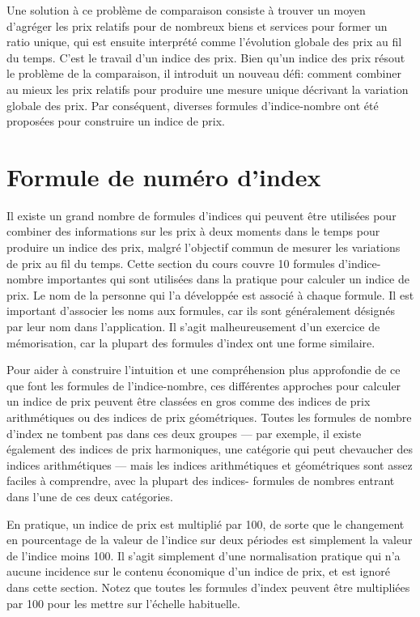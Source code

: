 \documentclass[]{article}
\begin{document}
Une solution à ce problème de comparaison consiste à trouver un moyen d'agréger les prix relatifs pour de nombreux biens et services pour former un ratio unique, qui est ensuite interprété comme l'évolution globale des prix au fil du temps. C'est le travail d'un indice des prix. Bien qu'un indice des prix résout le problème de la comparaison, il introduit un nouveau défi: comment combiner au mieux les prix relatifs pour produire une mesure unique décrivant la variation globale des prix. Par conséquent, diverses formules d'indice-nombre ont été proposées pour construire un indice de prix.

\hypertarget{formule-de-numuxe9ro-dindex}{%
\section{Formule de numéro d'index}\label{formule-de-numuxe9ro-dindex}}

Il existe un grand nombre de formules d'indices qui peuvent être utilisées pour combiner des informations sur les prix à deux moments dans le temps pour produire un indice des prix, malgré l'objectif commun de mesurer les variations de prix au fil du temps. Cette section du cours couvre 10 formules d'indice-nombre importantes qui sont utilisées dans la pratique pour calculer un indice de prix. Le nom de la personne qui l'a développée est associé à chaque formule. Il est important d'associer les noms aux formules, car ils sont généralement désignés par leur nom dans l'application. Il s'agit malheureusement d'un exercice de mémorisation, car la plupart des formules d'index ont une forme similaire.

Pour aider à construire l'intuition et une compréhension plus approfondie de ce que font les formules de l'indice-nombre, ces différentes approches pour calculer un indice de prix peuvent être classées en gros comme des indices de prix arithmétiques ou des indices de prix géométriques. Toutes les formules de nombre d'index ne tombent pas dans ces deux groupes --- par exemple, il existe également des indices de prix harmoniques, une catégorie qui peut chevaucher des indices arithmétiques --- mais les indices arithmétiques et géométriques sont assez faciles à comprendre, avec la plupart des indices- formules de nombres entrant dans l'une de ces deux catégories.

En pratique, un indice de prix est multiplié par 100, de sorte que le changement en pourcentage de la valeur de l'indice sur deux périodes est simplement la valeur de l'indice moins 100. Il s'agit simplement d'une normalisation pratique qui n'a aucune incidence sur le contenu économique d'un indice de prix, et est ignoré dans cette section. Notez que toutes les formules d'index peuvent être multipliées par 100 pour les mettre sur l'échelle habituelle.
\end{document}
